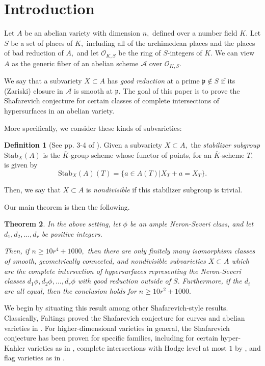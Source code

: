 \documentclass{article}
\newtheorem{thm}{Theorem}[section]
\theoremstyle{definition}
\newtheorem{defn}[thm]{Definition}
\theoremstyle{remark}
\begin{document}
\section{Introduction}
Let $A$ be an abelian variety with dimension $n,$ defined over a number field $K.$ Let $S$ be a set of places of $K,$ including all of the archimedean places and the places of bad reduction of $A,$ and let $\mathcal{O}_{K, S}$ be the ring of $S$-integers of $K.$ We can view $A$ as the generic fiber of an abelian scheme $\mathcal{A}$ over $\mathcal{O}_{K, S}.$ 
\par We say that a subvariety $X \subset A$ has \textit{good reduction} at a prime $\mathfrak{p} \not \in S$ if its (Zariski) closure in $\mathcal{A}$ is smooth at $\mathfrak{p}.$ The goal of this paper is to prove the Shafarevich conjecture for certain classes of complete intersections of hypersurfaces in an abelian variety.
\par More specifically, we consider these kinds of subvarieties:
\begin{defn}[See pp. 3-4 of \cite{km24}]
Given a subvariety $X \subset A,$ the \textit{stabilizer subgroup} $\text{Stab}_X(A)$ is the $\overline{K}$-group scheme whose functor of points, for an $\overline{K}$-scheme $T,$ is given by \[\text{Stab}_X(A)(T) = \{a \in A(T)|X_T + a= X_T\}.\]
\par Then, we say that $X \subset A$ is \textit{nondivisible} if this stabilizer subgroup is trivial.
\end{defn}
\par Our main theorem is then the following.
\begin{thm}\label{thm: main theorem}
In the above setting, let $\phi$ be an ample Neron-Severi class, and let $d_1, d_2, \ldots, d_r$ be positive integers. 
\par Then, if $n \geq 10r^4 + 1000,$ then there are only finitely many isomorphism classes of smooth, geometrically connected, and nondivisible subvarieties $X \subset A$ which are the complete intersection of hypersurfaces representing the Neron-Severi classes $d_1\phi, d_2\phi, \ldots, d_r\phi$ with good reduction outside of $S.$ Furthermore, if the $d_i$ are all equal, then the conclusion holds for $n \geq 10r^2 + 1000.$
\end{thm}
We begin by situating this result among other Shafarevich-style results. Classically, Faltings proved the Shafarevich conjecture for curves and abelian varieties in \cite{faltings}. For higher-dimensional varieties in general, the Shafarevich conjecture has been proven for specific families, including for certain hyper-Kahler varieties as in \cite{andreK3}, complete intersections with Hodge level at most $1$ by \cite{JavanLoughranLowHodge}, and flag varieties as in \cite{JLflag}.
\end{document}
